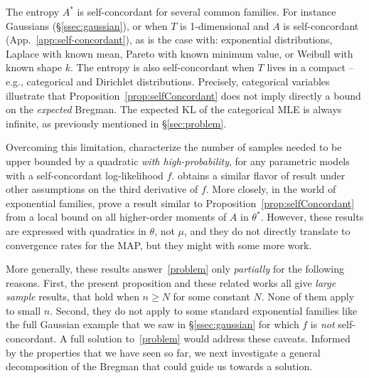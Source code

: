 \documentclass[twoside]{article}
\newcommand{\logpart}{A}
\newcommand{\conj}{{\logpart^*}}
\newcommand{\nat}{\theta}
\newcommand{\m}{\mu}
\begin{document}
The entropy $\conj$ is self-concordant for several common families.
For instance Gaussians (\S\ref{ssec:gaussian}), or when $T$ is 1-dimensional and $\logpart$ is self-concordant (App.~\ref{app:self-concordant}),
as is the case with:
exponential distributions,
Laplace with known mean,
Pareto with known minimum value,
or Weibull with known shape $k$.
The entropy is also self-concordant when $T$ lives in a compact \citep{bubeck2015entropic} -- e.g., categorical and Dirichlet distributions.
Precisely, categorical variables illustrate that Proposition~\ref{prop:selfConcordant} does not imply directly a bound on the \emph{expected} Bregman.
The expected KL of the categorical MLE is always infinite, as previously mentioned in \S\ref{sec:problem}.

Overcoming this limitation,
\citet{ostrovskii2021finite} characterize the number of samples needed to be upper bounded by a quadratic \emph{with high-probability}, for any parametric models with a self-concordant log-likelihood $f$.
\citet{anastasiou2017bounds} obtains a similar flavor of result under other assumptions on the third derivative of $f$.
More closely, in the world of exponential families, \citet{kakade2010learning} prove a result similar to Proposition~\ref{prop:selfConcordant} from a local bound on all higher-order moments of $\logpart$ in $\nat^*$.
However, these results are expressed with quadratics in $\nat$, not $\m$, and they do not directly translate to convergence rates for the MAP, but they might with some more work.

More generally, these results answer~\eqref{problem} only \emph{partially} for the following reasons.
First, the present proposition and these related works all give \textit{large sample} results,  that hold when $n\geq N$ for some constant $N$. 
None of them apply to small $n$.
Second, they do not apply to some standard exponential families like the full Gaussian example that we saw in \S\ref{ssec:gaussian}  for which $f$ is \emph{not} self-concordant. 
A full solution to~\eqref{problem} would address these caveats.
Informed by the properties that we have seen so far, we next investigate a general decomposition of the Bregman that could guide us towards a solution.
\end{document}
